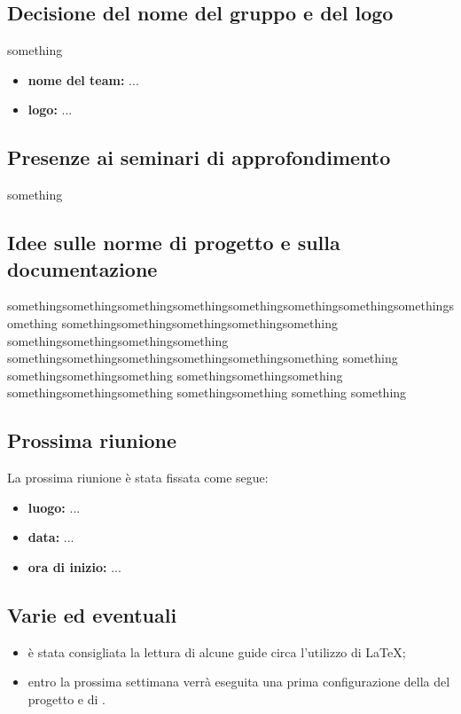 \subsection{Decisione del nome del gruppo e del logo}

something
\begin{itemize}
	\item \textbf{nome del team:} ...
	\item \textbf{logo:} ...
\end{itemize}

\subsection{Presenze ai seminari di approfondimento}

something

\subsection{Idee sulle norme di progetto e sulla documentazione}


somethingsomethingsomethingsomethingsomethingsomethingsomethingsomethingsomething somethingsomethingsomethingsomethingsomething somethingsomethingsomethingsomething somethingsomethingsomethingsomethingsomethingsomething something
\newline
somethingsomethingsomething somethingsomethingsomething somethingsomethingsomething somethingsomething something something 

\subsection{Prossima riunione}

La prossima riunione è stata fissata come segue:
\begin{itemize}
	\item \textbf{luogo:} ...
	\item \textbf{data:} ...
	\item \textbf{ora di inizio:} ...
\end{itemize}


\subsection{Varie ed eventuali}

\begin{itemize}

	\item è stata consigliata la lettura di alcune guide circa l'utilizzo di \LaTeX{};
	\item entro la prossima settimana verrà eseguita una prima configurazione della  del progetto e di .
\end{itemize}


